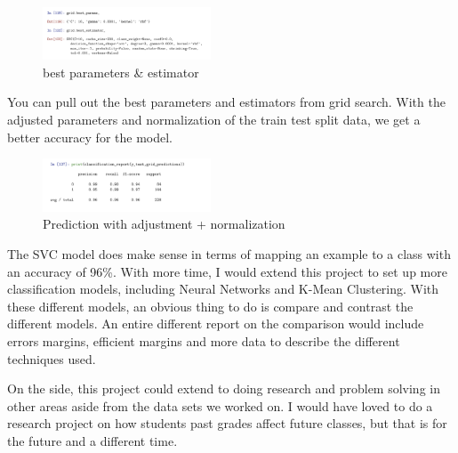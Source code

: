 \documentclass[conference]{IEEEtran}
\begin{document}
\begin{figure}[htbp]
\centerline{\includegraphics[width=50mm,scale=0.5]{imgs/params}}
\caption{best parameters \& estimator}
\label{fig}
\end{figure}

You can pull out the best parameters and estimators from grid search. With the adjusted parameters and normalization of the train test split data, we get a better accuracy for the model.

\begin{figure}[htbp]
\centerline{\includegraphics[width=50mm,scale=0.5]{imgs/class2}}
\caption{Prediction with  adjustment + normalization}
\label{fig}
\end{figure}

The SVC model does make sense in terms of mapping an example to a class with an accuracy of 96\%. With more time, I would extend this project to set up more classification models, including Neural Networks and K-Mean Clustering. With these different models, an obvious thing to do is compare and contrast the different models. An entire different report on the comparison would include errors margins, efficient margins and more data to describe the different techniques used. 

On the side, this project could extend to doing research and problem solving in other areas aside from the data sets we worked on. I would have loved to do a research project on how students past grades affect future classes, but that is for the future and a different time.
\end{document}
